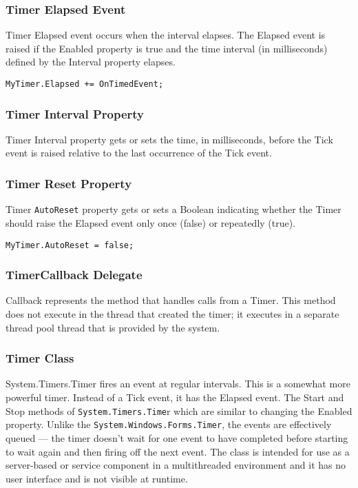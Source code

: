 \subsubsection*{Timer Elapsed Event}
Timer Elapsed event occurs when the interval elapses. The Elapsed event is raised if the Enabled property is true and the time interval (in milliseconds) defined by the Interval property elapses.

\begin{lstlisting}[numbers=none]
	MyTimer.Elapsed += OnTimedEvent;
\end{lstlisting}

\subsubsection*{Timer Interval Property}
Timer Interval property gets or sets the time, in milliseconds, before the Tick event is raised relative to the last occurrence of the Tick event.


\subsubsection*{Timer Reset Property}
Timer \texttt{AutoReset} property gets or sets a Boolean indicating whether the Timer should raise the Elapsed event only once (false) or repeatedly (true).

\begin{lstlisting}[numbers=none]
	MyTimer.AutoReset = false;
\end{lstlisting}


\subsubsection*{TimerCallback Delegate}
Callback represents the method that handles calls from a Timer. This method does not execute in the thread that created the timer; it executes in a separate thread pool thread that is provided by the system.

\subsubsection*{Timer Class}
System.Timers.Timer fires an event at regular intervals. This is a somewhat more powerful timer. Instead of a Tick event, it has the Elapsed event. The Start and Stop methods of \texttt{System.Timers.Time}r which are similar to changing the Enabled property. Unlike the \texttt{System.Windows.Forms.Timer}, the events are effectively queued --- the timer doesn't wait for one event to have completed before starting to wait again and then firing off the next event. The class is intended for use as a server-based or service component in a multithreaded environment and it has no user interface and is not visible at runtime.

